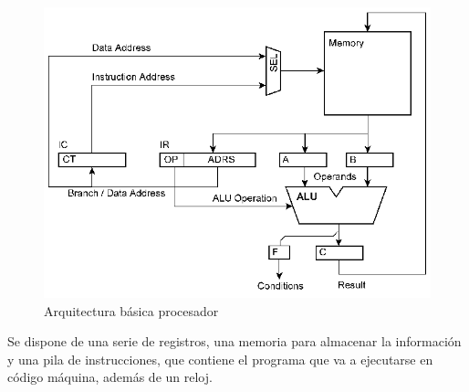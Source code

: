 \begin{center}
	\begin{figure}[H]
		\center
		\includegraphics[scale=0.3]{imagenes/EstadoArte/processor.png}
		\caption{Arquitectura básica procesador}
		\label{fig:arquitectura_procesador}
	\end{figure} 
\end{center}


Se dispone de una serie de registros, una memoria para almacenar la información y una pila de instrucciones, que contiene el programa que va a ejecutarse en código máquina, además de un reloj.\newline

